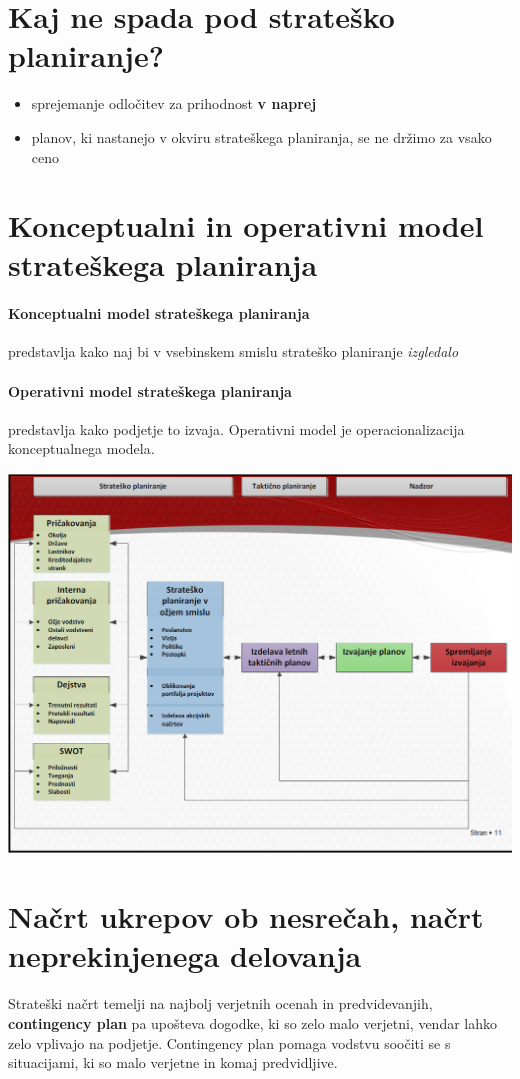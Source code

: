 \documentclass[a4paper,12pt]{report}
\begin{document}
   \section{Kaj ne spada pod strateško planiranje?}
         \begin{itemize}
            \item sprejemanje odločitev za prihodnost \textbf{v naprej}
            \item planov, ki nastanejo v okviru strateškega planiranja, se ne držimo za vsako ceno
         \end{itemize}

   \section{Konceptualni in operativni model strateškega planiranja}
         \paragraph{Konceptualni model strateškega planiranja} predstavlja kako naj bi v vsebinskem smislu strateško planiranje \emph{izgledalo}
         \paragraph{Operativni model strateškega planiranja} predstavlja kako podjetje to izvaja. Operativni model je operacionalizacija konceptualnega modela.

         \includegraphics[scale=0.38]{002.png}
   
   \section{Načrt ukrepov ob nesrečah, načrt neprekinjenega delovanja}
      Strateški načrt temelji na najbolj verjetnih ocenah in predvidevanjih, \textbf{contingency plan} pa upošteva dogodke, ki so zelo malo verjetni, vendar lahko zelo vplivajo na podjetje. Contingency plan pomaga vodstvu soočiti se s situacijami, ki so malo verjetne in komaj predvidljive.
\end{document}
